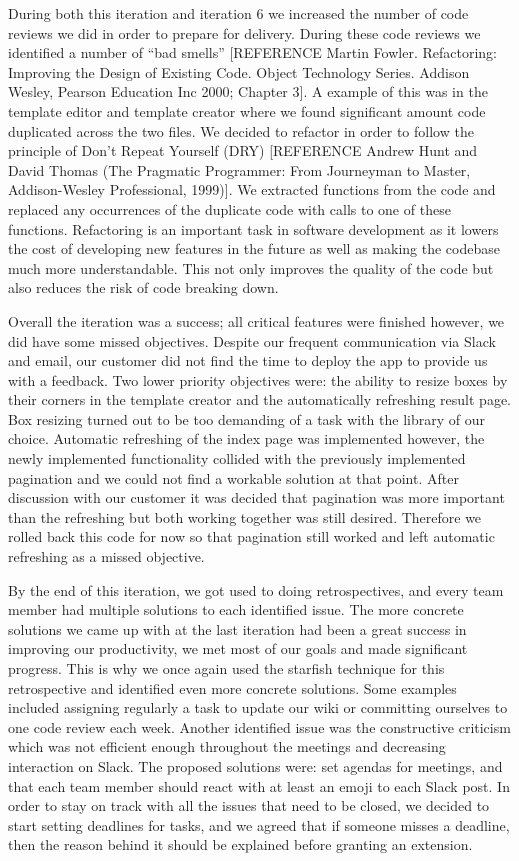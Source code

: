 \documentclass{l3proj}
\begin{document}
During both this iteration and iteration 6 we increased the number of code reviews we did in order to prepare for delivery. During these code reviews we identified a number of ``bad smells'' [REFERENCE Martin Fowler. Refactoring: Improving the Design of Existing Code. Object Technology Series. Addison Wesley, Pearson Education Inc 2000; Chapter 3]. A example of this was in the template editor and template creator where we found significant amount code duplicated across the two files. We decided to refactor in order to follow the principle of Don’t Repeat Yourself (DRY) [REFERENCE Andrew Hunt and David Thomas (The Pragmatic Programmer: From Journeyman to Master, Addison-Wesley Professional, 1999)]. We extracted functions from the code and replaced any occurrences of the duplicate code with calls to one of these functions. Refactoring is an important task in software development as it lowers the cost of developing new features in the future as well as making the codebase much more understandable. This not only improves the quality of the code but also reduces the risk of code breaking down.

Overall the iteration was a success; all critical features were finished however, we did have some missed objectives. Despite our frequent communication via Slack and email, our customer did not find the time to deploy the app to provide us with a feedback. Two lower priority objectives were: the ability to resize boxes by their corners in the template creator and the automatically refreshing result page. Box resizing turned out to be too demanding of a task with the library of our choice. Automatic refreshing of the index page was implemented however, the newly implemented functionality collided with the previously implemented pagination and we could not find a workable solution at that point. After discussion with our customer it was decided that pagination was more important than the refreshing but both working together was still desired. Therefore we rolled back this code for now so that pagination still worked and left automatic refreshing as a missed objective. 

By the end of this iteration, we got used to doing retrospectives, and every team member had multiple solutions to each identified issue. The more concrete solutions we came up with at the last iteration had been a great success in improving our productivity, we met most of our goals and made significant progress. This is why we once again used the starfish technique for this retrospective and identified  even more concrete solutions. Some examples included assigning regularly a task to update our wiki or committing ourselves to one code review each week. Another identified issue was the constructive criticism which was not efficient enough throughout the meetings and decreasing interaction on Slack. The proposed solutions were: set agendas for meetings, and that each team member should react with at least an emoji to each Slack post.
In order to stay on track with all the issues that need to be closed, we decided to start setting deadlines for tasks, and we agreed that if someone misses a deadline, then the reason behind it should be explained before granting an extension.
\end{document}
